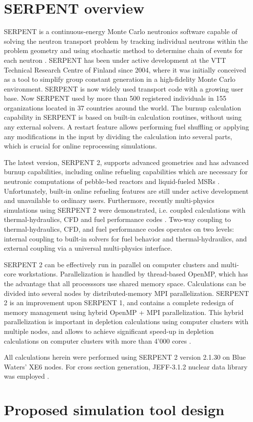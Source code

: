 \section{SERPENT overview}
SERPENT is a continuous-energy Monte Carlo neutronics software capable of solving the neutron transport problem by tracking individual neutrons within the problem geometry and using stochastic method to determine chain of events for each neutron \cite{leppanen_serpent_2015}. SERPENT has been under active development at the VTT Technical Research Centre of Finland since 2004, where it was initially conceived as a tool to simplify group constant generation in a high-fidelity Monte Carlo environment. SERPENT is now widely used transport code  with a growing user base. Now SERPENT used by more than 500 registered individuals in 155 organizations located in 37 countries around the world. The burnup calculation capability in SERPENT is based on built-in calculation routines, without using any external solvers. A restart feature allows performing fuel shuffling or applying any modifications in the input by dividing the calculation into several parts, which is crucial for online reprocessing simulations.

The latest version, SERPENT 2, supports advanced geometries and has advanced burnup capabilities, including online refueling capabilities which are necessary for neutronic computations of pebble-bed reactors and liquid-fueled \glspl{MSR} \cite{aufiero_extended_2013}. Unfortunately, built-in online refueling features are still under active development and unavailable to ordinary users. Furthermore, recently multi-physics simulations using SERPENT 2 were demonstrated, i.e. coupled calculations with thermal-hydraulics, \gls{CFD} and fuel performance codes \cite{leppanen_numerical_2015}. Two-way coupling to thermal-hydraulics, \gls{CFD}, and fuel performance codes operates on two levels: internal coupling to built-in solvers for fuel behavior and thermal-hydraulics, and external coupling via a universal multi-physics interface. 

SERPENT 2 can be effectively run in parallel on computer clusters and multi-core workstations. Parallelization is handled by thread-based OpenMP, which has the advantage that all processsors use shared memory space. Calculations can be divided into several nodes by distributed-memory \gls{MPI} parallelization. SERPENT 2  is an improvement upon SERPENT 1, and contains a complete redesign of memory management using hybrid OpenMP \cite{dagum_openmp_1998} + \gls{MPI} parallelization.  This hybrid parallelization is important in depletion calculations using computer clusters with multiple nodes, and allows to achieve significant speed-up in depletion calculations on computer clusters with more than 4'000 cores \cite{leppanen_serpent_2015}. 

All calculations herein were performed using SERPENT 2 version 2.1.30 on Blue Waters’ XE6 nodes. For cross section generation, JEFF-3.1.2 nuclear data library was employed \cite{oecd/nea_data_bank_jeff-3.1.2_2014}. 

\section{Proposed simulation tool design}